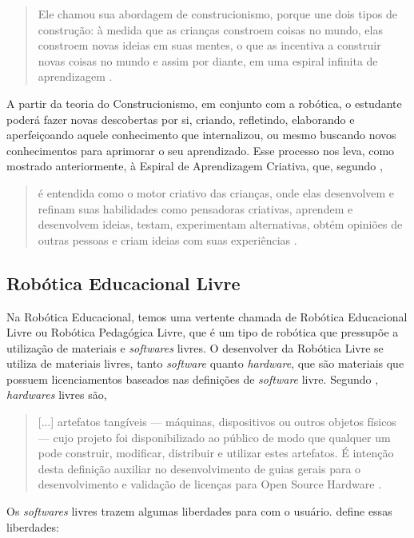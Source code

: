 \documentclass{textolivre}
\begin{document}
\begin{quote}
Ele chamou sua abordagem de construcionismo, porque une dois tipos de construção: à medida que as crianças constroem coisas no mundo, elas constroem novas ideias em suas mentes, o que as incentiva a construir novas coisas no mundo e assim por diante, em uma espiral infinita de aprendizagem \cite[p. 68]{resnick2020}.
\end{quote}

A partir da teoria do Construcionismo, em conjunto com a robótica, o estudante poderá fazer novas descobertas por si, criando, refletindo, elaborando e aperfeiçoando aquele conhecimento que internalizou, ou mesmo buscando novos conhecimentos para aprimorar o seu aprendizado. Esse processo nos leva, como mostrado anteriormente, à Espiral de Aprendizagem Criativa, que, segundo \textcite{resnick2020}, 

\begin{quote}
é entendida como o motor criativo das crianças, onde elas desenvolvem e refinam suas habilidades como pensadoras criativas, aprendem e desenvolvem ideias, testam, experimentam alternativas, obtém opiniões de outras pessoas e criam ideias com suas experiências \cite[p. 41]{resnick2020}.
\end{quote}

\subsection{Robótica Educacional Livre}
Na Robótica Educacional, temos uma vertente chamada de Robótica Educacional Livre ou Robótica Pedagógica Livre, que é um tipo de robótica que pressupõe a utilização de materiais e \emph{softwares} livres. O desenvolver da Robótica Livre se utiliza de materiais livres, tanto \emph{software} quanto \emph{hardware}, que são materiais que possuem licenciamentos baseados nas definições de \emph{software} livre. Segundo \textcite{association}, \emph{hardwares} livres são,

\begin{quote}
[...] artefatos tangíveis — máquinas, dispositivos ou outros objetos físicos — cujo projeto foi disponibilizado ao público de modo que qualquer um pode construir, modificar, distribuir e utilizar estes artefatos. É intenção desta definição auxiliar no desenvolvimento de guias gerais para o desenvolvimento e validação de licenças para Open Source Hardware \cite{association}.
\end{quote}

Os \emph{softwares} livres trazem algumas liberdades para com o usuário. \textcite{stallman2002} define essas liberdades:
\end{document}
